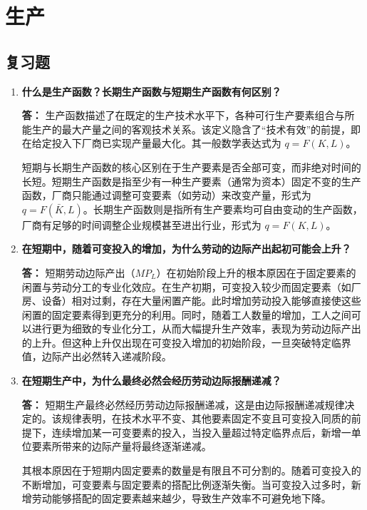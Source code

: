 	\chapter{生产}
	
	\section{复习题}
	\begin{enumerate}[label=\textbf{\arabic*.}, leftmargin=*]
		\item \textbf{什么是生产函数？长期生产函数与短期生产函数有何区别？}
		
		\textbf{答：}
		生产函数描述了在既定的生产技术水平下，各种可行生产要素组合与所能生产的最大产量之间的客观技术关系。该定义隐含了“技术有效”的前提，即在给定投入下厂商已实现产量最大化。其一般数学表达式为 $q=F(K,L)$。
		
		短期与长期生产函数的核心区别在于生产要素是否全部可变，而非绝对时间的长短。短期生产函数是指至少有一种生产要素（通常为资本）固定不变的生产函数，厂商只能通过调整可变要素（如劳动）来改变产量，形式为 $q=F(\bar{K},L)$。长期生产函数则是指所有生产要素均可自由变动的生产函数，厂商有足够的时间调整企业规模甚至进出行业，形式为 $q=F(K,L)$。
		
		\item \textbf{在短期中，随着可变投入的增加，为什么劳动的边际产出起初可能会上升？}
		
		\textbf{答：}
		短期劳动边际产出（$MP_L$）在初始阶段上升的根本原因在于固定要素的闲置与劳动分工的专业化效应。在生产初期，可变投入较少而固定要素（如厂房、设备）相对过剩，存在大量闲置产能。此时增加劳动投入能够直接使这些闲置的固定要素得到更充分的利用。同时，随着工人数量的增加，工人之间可以进行更为细致的专业化分工，从而大幅提升生产效率，表现为劳动边际产出的上升。但这种上升仅出现在可变投入增加的初始阶段，一旦突破特定临界值，边际产出必然转入递减阶段。
		
		\item \textbf{在短期生产中，为什么最终必然会经历劳动边际报酬递减？}
		
		\textbf{答：}
		短期生产最终必然经历劳动边际报酬递减，这是由边际报酬递减规律决定的。该规律表明，在技术水平不变、其他要素固定不变且可变投入同质的前提下，连续增加某一可变要素的投入，当投入量超过特定临界点后，新增一单位要素所带来的边际产量将最终逐渐递减。
		
		其根本原因在于短期内固定要素的数量是有限且不可分割的。随着可变投入的不断增加，可变要素与固定要素的搭配比例逐渐失衡。当可变投入过多时，新增劳动能够搭配的固定要素越来越少，导致生产效率不可避免地下降。
		

\end{enumerate}
